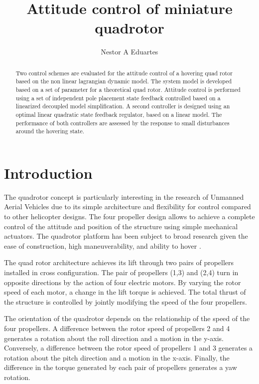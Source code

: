 \documentclass[12pt]{article}
\title{Attitude control of miniature quadrotor}
\author{Nestor A Eduartes}
\begin{document}
 
\maketitle
 
\begin{abstract}
Two control schemes are evaluated for the attitude control of a hovering quad rotor based on the non linear lagrangian dynamic model. The system model is developed based on a set of parameter for a theoretical quad rotor. Attitude control is performed using a set of independent pole placement state feedback controlled based on a linearized decoupled model simplification. A second controller is designed using an optimal linear quadratic state feedback regulator, based on a linear model. The performance of both controllers are assessed by the response to small disturbances around the hovering state.
\end{abstract}

\section{Introduction}
The quadrotor concept is particularly interesting in the research of Unmanned Aerial Vehicles due to its simple architecture and flexibility for control compared to other helicopter designs. The four propeller design allows to achieve a complete control of the attitude and position of the structure using simple mechanical actuators. The quadrotor platform has been subject to broad research given the ease of construction, high  maneuverability, and ability to hover \cite{Cabe14}.

The quad rotor architecture achieves its lift through two pairs of propellers installed in cross configuration. The pair of propellers (1,3) and (2,4) turn in opposite directions by the action of four electric motors. By varying the rotor speed of each motor, a change in the lift torque is achieved. The total thrust of the structure is controlled by jointly modifying the speed of the four propellers. 

The orientation of the quadrotor depends on the relationship of the speed of the four propellers. A difference between the rotor speed of propellers 2 and 4 generates a rotation about the roll direction and a motion in the y-axis. Conversely, a difference between the rotor speed of propellers 1 and 3 generates a rotation about the pitch direction and a motion in the x-axis. Finally, the difference in the torque generated by each pair of propellers generates a yaw rotation.
\end{document}
